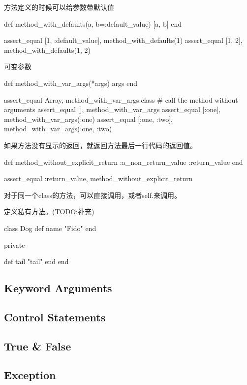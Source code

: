 方法定义的时候可以给参数带默认值
\begin{Ruby}
  	def method_with_defaults(a, b=:default_value)
    	[a, b]
  	end
  
    assert_equal [1, :default_value], method_with_defaults(1)
    assert_equal [1, 2], method_with_defaults(1, 2)
\end{Ruby}

可变参数
\begin{Ruby}
  	def method_with_var_args(*args)
   		args
  	end
  
    assert_equal Array, method_with_var_args.class # call the method without arguments
    assert_equal [], method_with_var_args
    assert_equal [:one], method_with_var_args(:one)
    assert_equal [:one, :two], method_with_var_args(:one, :two)
\end{Ruby}

如果方法没有显示的返回，就返回方法最后一行代码的返回值。
\begin{Ruby}
  	def method_without_explicit_return
    	:a_non_return_value
    	:return_value
  	end
  	
  	assert_equal :return_value, method_without_explicit_return
\end{Ruby}


对于同一个class的方法，可以直接调用，或者self.来调用。

定义私有方法。(TODO:补充)
\begin{Ruby}
  class Dog
    def name
      "Fido"
    end

    private

    def tail
      "tail"
    end
  end
\end{Ruby}

\subsection{Keyword Arguments}

\subsection{Control Statements}

\subsection{True \& False}

\subsection{Exception}


































